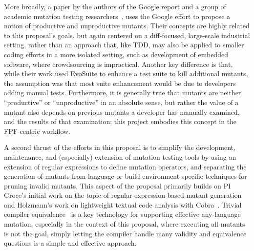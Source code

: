 More broadly, a paper by the
authors of the Google report and a group of academic mutation testing
researchers~\cite{ivankovic2018industrial}, uses the Google effort to
propose a notion of productive and unproductive mutants.  Their
concepts are highly related to this proposal's goals, but again centered on a
diff-focused, large-scale industrial setting, rather than an approach
that, like TDD, may also be applied to smaller coding efforts in a more
isolated setting, such as development of embedded software, where
crowdsourcing is impractical.  Another key difference is that, while their
work used EvoSuite to enhance a test suite to kill additional mutants,
the assumption was that most suite enhancement would be due to
developers adding manual tests.  Furthermore, it is generally true that mutants
are neither ``productive'' or ``unproductive'' in an absolute sense, but
rather the value of a mutant also depends on previous mutants a
developer has manually examined, and the results of that examination;
this project embodies this concept in the FPF-centric workflow.

A second thrust of the efforts in this proposal is to simplify the
development, maintenance, and (especially) extension of mutation
testing tools by using an extension of regular expressions to define
mutation operators, and separating the generation of mutants from
language or build-environment specific techniques for pruning invalid
mutants.  This aspect of the proposal primarily builds on PI Groce's initial work on the topic of
regular-expression-based mutant generation~\cite{regexpMut} and
Holzmann's work on lightweight textual code analysis with
Cobra~\cite{Cobra}.  Trivial compiler equivalence~\cite{TCE} is a key
technology for supporting effective any-language mutation; especially
in the context of this proposal, where executing all mutants is not
the goal, simply letting the compiler handle many validity and
equivalence questions is a simple and effective approach.